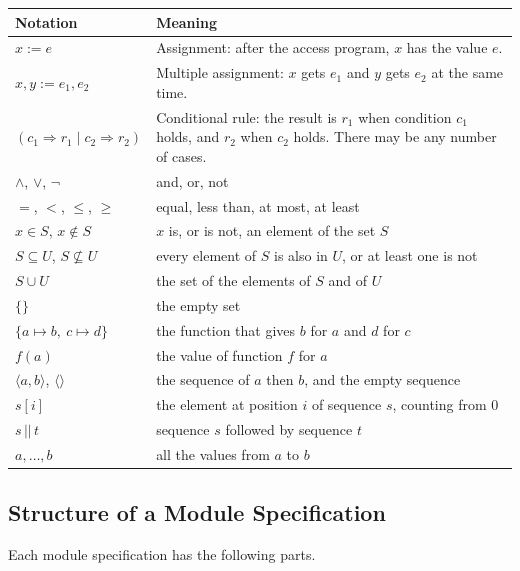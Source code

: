 \documentclass[10pt, titlepage]{article}
\begin{document}
\begin{center}
\renewcommand{\arraystretch}{1.3}
\begin{tabular}{p{4.6cm} p{10cm}}
\toprule
\textbf{Notation} & \textbf{Meaning}\\
\midrule
$x := e$ & Assignment: after the access program, $x$ has the value $e$.\\
$x, y := e_1, e_2$ & Multiple assignment: $x$ gets $e_1$ and $y$ gets $e_2$ at
the same time.\\
$(c_1 \Rightarrow r_1 \mid c_2 \Rightarrow r_2)$ & Conditional rule: the result
is $r_1$ when condition $c_1$ holds, and $r_2$ when $c_2$ holds. There may be
any number of cases.\\
$\wedge$, $\vee$, $\neg$ & and, or, not\\
$=$, $<$, $\leq$, $\geq$ & equal, less than, at most, at least\\
$x \in S$, $x \notin S$ & $x$ is, or is not, an element of the set $S$\\
$S \subseteq U$, $S \not\subseteq U$ & every element of $S$ is also in $U$,
or at least one is not\\
$S \cup U$ & the set of the elements of $S$ and of $U$\\
$\{\}$ & the empty set\\
$\{a \mapsto b,\ c \mapsto d\}$ & the function that gives $b$ for $a$ and $d$
for $c$\\
$f(a)$ & the value of function $f$ for $a$\\
$\langle a, b \rangle$, $\langle\rangle$ & the sequence of $a$ then $b$, and
the empty sequence\\
$s[i]$ & the element at position $i$ of sequence $s$, counting from 0\\
$s \,||\, t$ & sequence $s$ followed by sequence $t$\\
$a, \ldots, b$ & all the values from $a$ to $b$\\
\bottomrule
\end{tabular}
\end{center}

\subsection{Structure of a Module Specification}

Each module specification has the following parts.
\end{document}
